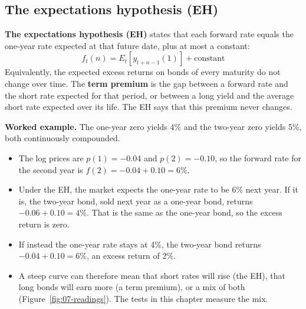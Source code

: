 \subsection{The expectations hypothesis (EH)}

\textbf{The expectations hypothesis (EH)} states that each forward rate equals the one-year rate expected at that future date, plus at most a constant:
\begin{equation}
  f_t(n) = E_t\!\left[y_{t+n-1}(1)\right] + \text{constant}
  \label{eq:07-eh}
\end{equation}
Equivalently, the expected excess returns on bonds of every maturity do not change over time. The \textbf{term premium} is the gap between a forward rate and the short rate expected for that period, or between a long yield and the average short rate expected over its life. The EH says that this premium never changes.

\textbf{Worked example.} The one-year zero yields 4\% and the two-year zero yields 5\%, both continuously compounded.

\begin{itemize}
  \item The log prices are $p(1) = -0.04$ and $p(2) = -0.10$, so the forward rate for the second year is $f(2) = -0.04 + 0.10 = 6\%$.
  \item Under the EH, the market expects the one-year rate to be 6\% next year. If it is, the two-year bond, sold next year as a one-year bond, returns $-0.06 + 0.10 = 4\%$. That is the same as the one-year bond, so the excess return is zero.
  \item If instead the one-year rate stays at 4\%, the two-year bond returns $-0.04 + 0.10 = 6\%$, an excess return of 2\%.
  \item A steep curve can therefore mean that short rates will rise (the EH), that long bonds will earn more (a term premium), or a mix of both (Figure~\ref{fig:07-readings}). The tests in this chapter measure the mix.
\end{itemize}

